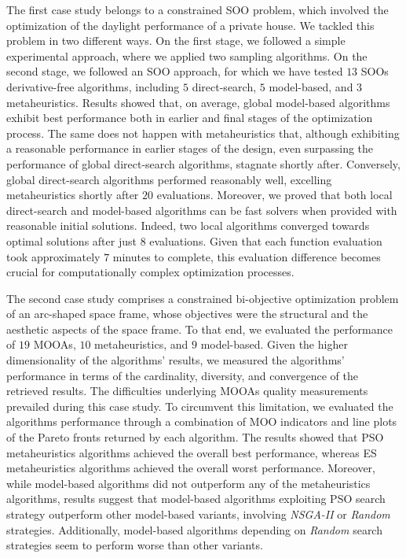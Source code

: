 The first case study belongs to a constrained \ac{SOO} problem, which involved the optimization of the daylight performance of a private house. We tackled this problem in two different ways. On the first stage, we followed a simple experimental approach, where we applied two sampling algorithms. On the second stage, we followed an \ac{SOO} approach, for which we have tested $13$ \acp{SOO} derivative-free algorithms, including $5$ direct-search, $5$ model-based, and $3$ metaheuristics. Results showed that, on average, global model-based algorithms exhibit best performance both in earlier and final stages of the optimization process. The same does not happen with metaheuristics that, although exhibiting a reasonable performance in earlier stages of the design, even surpassing the performance of global direct-search algorithms, stagnate shortly after. Conversely, global direct-search algorithms performed reasonably well, excelling metaheuristics shortly after $20$ evaluations. Moreover, we proved that both local direct-search and model-based algorithms can be fast solvers when provided with reasonable initial solutions. Indeed, two local algorithms converged towards optimal solutions after just $8$ evaluations. Given that each function evaluation took approximately $7$ minutes to complete, this evaluation difference becomes crucial for computationally complex optimization processes.

The second case study comprises a constrained bi-objective optimization problem of an arc-shaped space frame, whose objectives were the structural and the aesthetic aspects of the space frame. To that end, we evaluated the performance of $19$ \acp{MOOA}, $10$ metaheuristics, and $9$ model-based. Given the higher dimensionality of the algorithms' results, we measured the algorithms' performance in terms of the cardinality, diversity, and convergence of the retrieved results. The difficulties underlying \acp{MOOA} quality measurements prevailed during this case study. To circumvent this limitation, we evaluated the algorithms performance through a combination of \ac{MOO} indicators and line plots of the Pareto fronts returned by each algorithm. The results showed that \ac{PSO} metaheuristics algorithms achieved the overall best performance, whereas \ac{ES} metaheuristics algorithms achieved the overall worst performance. Moreover, while model-based algorithms did not outperform any of the metaheuristics algorithms, results suggest that model-based algorithms exploiting \ac{PSO} search strategy outperform other model-based variants, involving \textit{NSGA-II} or \textit{Random} strategies. Additionally, model-based algorithms depending on \textit{Random} search strategies seem to perform worse than other variants. 

